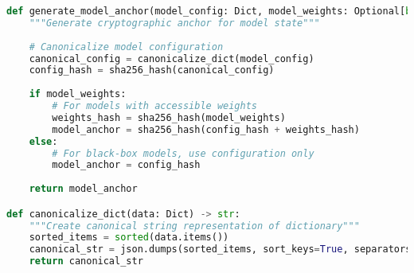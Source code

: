 \documentclass[12pt,a4paper]{article}
\begin{document}
\begin{lstlisting}[language=Python, caption=Model State Anchor Generation]
def generate_model_anchor(model_config: Dict, model_weights: Optional[bytes] = None) -> str:
    """Generate cryptographic anchor for model state"""
    
    # Canonicalize model configuration
    canonical_config = canonicalize_dict(model_config)
    config_hash = sha256_hash(canonical_config)
    
    if model_weights:
        # For models with accessible weights
        weights_hash = sha256_hash(model_weights)
        model_anchor = sha256_hash(config_hash + weights_hash)
    else:
        # For black-box models, use configuration only
        model_anchor = config_hash
    
    return model_anchor

def canonicalize_dict(data: Dict) -> str:
    """Create canonical string representation of dictionary"""
    sorted_items = sorted(data.items())
    canonical_str = json.dumps(sorted_items, sort_keys=True, separators=(",", ":"), ensure_ascii=True)
    return canonical_str
\end{lstlisting}
\end{document}
